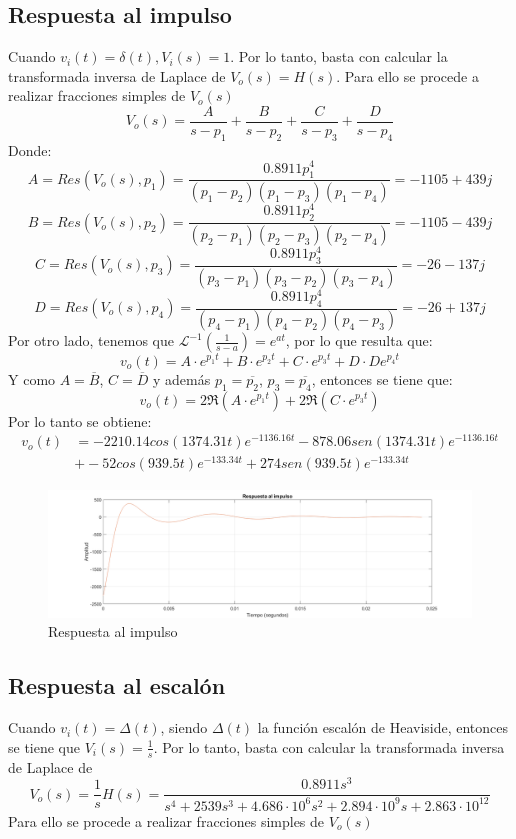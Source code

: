 \subsection{Respuesta al impulso}
Cuando $v_i(t) = \delta(t), V_i(s) = 1$. Por lo tanto, basta con calcular la transformada inversa de Laplace de $V_o(s) = H(s)$. Para ello se procede a realizar fracciones simples de $V_o(s)$
$$
V_o(s) = \frac{A}{s-p_1} + \frac{B}{s-p_2} + \frac{C}{s-p_3} + \frac{D}{s-p_4}
$$
\vskip0.5cm
Donde:
$$
A = Res(V_o(s), p_1) = \frac{0.8911 p_1^4}{(p_1-p_2)(p_1-p_3)(p_1-p_4)} = -1105 + 439j
$$
$$
B = Res(V_o(s), p_2) = \frac{0.8911 p_2^4}{(p_2-p_1)(p_2-p_3)(p_2-p_4)} = -1105 - 439j
$$
$$
C = Res(V_o(s), p_3) = \frac{0.8911 p_3^4}{(p_3-p_1)(p_3-p_2)(p_3-p_4)} = -26 - 137j
$$
$$
D = Res(V_o(s), p_4) = \frac{0.8911 p_4^4}{(p_4-p_1)(p_4-p_2)(p_4-p_3)} = -26 + 137j
$$
\vskip0.5cm
Por otro lado, tenemos que $\mathcal{L}^{-1}(\frac{1}{s-a}) = e^{at}$, por lo que resulta que:
$$
v_o(t) = A \cdot e^{p_1t} + B \cdot e^{p_2t} + C \cdot e^{p_3t} + D \cdot D e^{p_4t}
$$
\vskip0.5cm
Y como $ A = \overline{B}$, $C = \overline{D}$ y además $p_1 = \overline{p_2}$, $p_3 = \overline{p_4}$, entonces se tiene que:
$$
v_o(t) = 2\Re(A \cdot e^{p_1t}) + 2\Re(C \cdot e^{p_3 t})
$$
\vskip0.5cm
Por lo tanto se obtiene:
\begin{align*}
    v_o(t) & = -2210.14 cos(1374.31t)e^{-1136.16t} -878.06sen(1374.31t)e^{-1136.16t}\\
           & + -52 cos(939.5t) e^{-133.34t} + 274 sen(939.5t)e^{-133.34t}
\end{align*}

\begin{figure}[H]
    \centering
    \includegraphics[width=1\textwidth]{resources/RespuestaAlImpulso.png}
    \caption{Respuesta al impulso}
\end{figure} 

\subsection{Respuesta al escalón}
Cuando $v_i(t) = \Delta(t)$, siendo $\Delta(t)$ la función escalón de Heaviside, entonces se tiene que $V_i(s) = \frac{1}{s}$. Por lo tanto, basta con calcular la transformada inversa de Laplace de
$$
V_o(s) = \frac{1}{s} H(s) = \frac{0.8911 s^3}{s^4 + 2539 s^3 + 4.686 \cdot 10^6 s^2 + 2.894 \cdot 10^9 s + 2.863 \cdot 10^{12}}$$
\vskip0.5cm
Para ello se procede a realizar fracciones simples de $V_o(s)$

